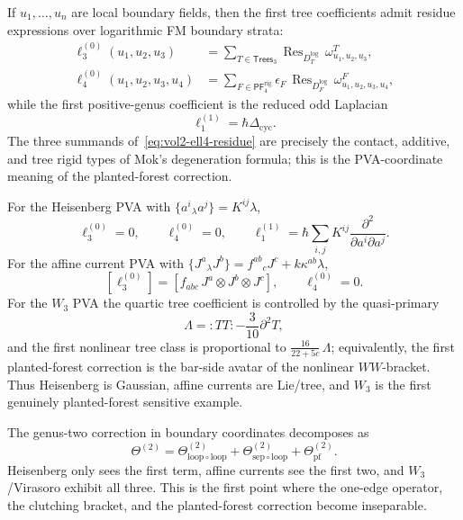 \begin{construction}
\label{const:vol2-pva-coordinate-graph-coefficients}
If $u_1,\dots,u_n$ are local boundary fields, then the first tree
coefficients admit residue expressions over logarithmic FM boundary
strata:
\begin{align}
\ell_3^{(0)}(u_1,u_2,u_3)
&=
\sum_{T\in \mathsf{Trees}_3}
\operatorname{Res}_{D_T^{\log}}\,\omega^{T}_{u_1,u_2,u_3},
\label{eq:vol2-ell3-residue}\\
\ell_4^{(0)}(u_1,u_2,u_3,u_4)
&=
\sum_{F\in \mathsf{PF}^{\mathrm{rig}}_4}
\epsilon_F\,\operatorname{Res}_{D_F^{\log}}\,\omega^{F}_{u_1,u_2,u_3,u_4},
\label{eq:vol2-ell4-residue}
\end{align}
while the first positive-genus coefficient is the reduced odd Laplacian
\begin{equation}
\label{eq:vol2-loop-laplacian}
\ell_1^{(1)}=\hbar\Delta_{\mathrm{cyc}}.
\end{equation}
The three summands of~\eqref{eq:vol2-ell4-residue} are precisely the
contact, additive, and tree rigid types of Mok's degeneration formula;
this is the PVA-coordinate meaning of the planted-forest correction.
\end{construction}

\begin{computation}
\label{comp:vol2-archetype-formulas}
For the Heisenberg PVA with
$\{a^i{}_{\lambda}a^j\}=K^{ij}\lambda$,
\[
\ell_3^{(0)}=0,
\qquad
\ell_4^{(0)}=0,
\qquad
\ell_1^{(1)}
=
\hbar\sum_{i,j}K^{ij}\frac{\partial^2}{\partial a^i\partial a^j}.
\]
For the affine current PVA with
$\{J^a{}_{\lambda}J^b\}=f^{ab}{}_cJ^c+k\kappa^{ab}\lambda$,
\[
[\ell_3^{(0)}]
=
[f_{abc}\,J^a\otimes J^b\otimes J^c],
\qquad
\ell_4^{(0)}=0.
\]
For the $W_3$ PVA the quartic tree coefficient is controlled by the
quasi-primary
\[
\Lambda={:}TT{:}-\frac{3}{10}\partial^2T,
\]
and the first nonlinear tree class is proportional to
$\frac{16}{22+5c}\,\Lambda$; equivalently, the first planted-forest
correction is the bar-side avatar of the nonlinear $WW$-bracket.  Thus
Heisenberg is Gaussian, affine currents are Lie/tree, and $W_3$ is the
first genuinely planted-forest sensitive example.
\end{computation}

\begin{remark}
\label{rem:vol2-genus-two-entry}
The genus-two correction in boundary coordinates decomposes as
\[
\Theta^{(2)}
=
\Theta^{(2)}_{\mathrm{loop}\circ\mathrm{loop}}
+\Theta^{(2)}_{\mathrm{sep}\circ\mathrm{loop}}
+\Theta^{(2)}_{\mathrm{pf}}.
\]
Heisenberg only sees the first term, affine currents see the first two,
and $W_3$/Virasoro exhibit all three.  This is the first point where the
one-edge operator, the clutching bracket, and the planted-forest
correction become inseparable.
\end{remark}

